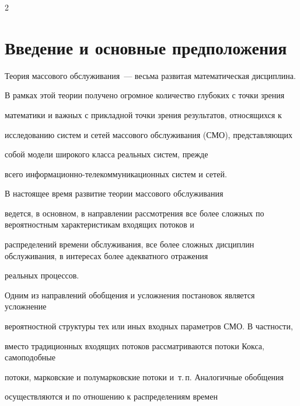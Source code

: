 \begin{multicols}{2}








\label{st\stat}








\section{Введение и основные предположения}





Теория массового обслуживания~--- весьма развитая математическая дисциплина. 


В рамках этой теории получено огромное количество глубоких с точки зрения 


математики и важных с прикладной точки зрения результатов, относящихся к


исследованию систем и сетей массового обслуживания (СМО), представляющих 


собой модели широкого класса реальных систем, прежде


всего информационно-телекоммуникационных систем и сетей. 


В настоящее время развитие теории массового обслуживания


ведется, в основном, в на\-прав\-ле\-нии рас\-смот\-ре\-ния все более сложных по вероятностным характеристикам входящих потоков и


распределений времени обслуживания, все более сложных дис\-цип\-лин обслуживания, в интересах более адекватного отражения


реальных процессов.





Одним из направлений обобщения и усложнения постановок является усложнение 


вероятностной структуры тех или иных входных параметров СМО. В частности,  


вместо традиционных входящих потоков рассматриваются потоки Кокса, самоподобные 


потоки, марковские и полумарковские потоки и~т.\,п. Аналогичные обобщения 


осуществляются и по отношению к распределениям времен %



\end{multicols}
